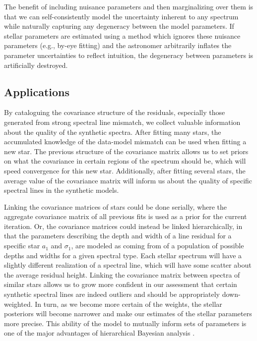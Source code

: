 \documentclass[iop,floatfix]{emulateapj}
\begin{document}
The benefit of including nuisance parameters and then marginalizing over them is that we can self-consistently model the uncertainty inherent to any spectrum while naturally capturing any degeneracy between the model parameters. If stellar parameters are estimated using a method which ignores these nuisance parameters (e.g., by-eye fitting) and the astronomer arbitrarily inflates the parameter uncertainties to reflect intuition, the degeneracy between parameters is artificially destroyed. 

\subsection{Applications}
\label{subsec:learning}
By cataloguing the covariance structure of the residuals, especially those generated from strong spectral line mismatch, we collect valuable information about the quality of the synthetic spectra. After fitting many stars, the accumulated knowledge of the data-model mismatch can be used when fitting a new star. The previous structure of the covariance matrix allows us to set priors on what the covariance in certain regions of the spectrum should be, which will speed convergence for this new star. Additionally, after fitting several stars, the average value of the covariance matrix will inform us about the quality of specific spectral lines in the synthetic models. 

Linking the covariance matrices of stars could be done serially, where the aggregate covariance matrix of all previous fits is used as a prior for the current iteration. Or, the covariance matrices could instead be linked hierarchically, in that the parameters describing the depth and width of a line residual for a specific star $a_1$ and $\sigma_1$, are modeled as coming from of a population of possible depths and widths for a given spectral type. Each stellar spectrum will have a slightly different realization of a spectral line, which will have some scatter about the average residual height. Linking the covariance matrix between spectra of similar stars allows us to grow more confident in our assessment that certain synthetic spectral lines are indeed outliers and should be appropriately down-weighted. In turn, as we become more certain of the weights, the stellar posteriors will become narrower and make our estimates of the stellar parameters more precise. This ability of the model to mutually inform sets of parameters is one of the major advantages of hierarchical Bayesian analysis \citep{kruschke10}.
\end{document}
